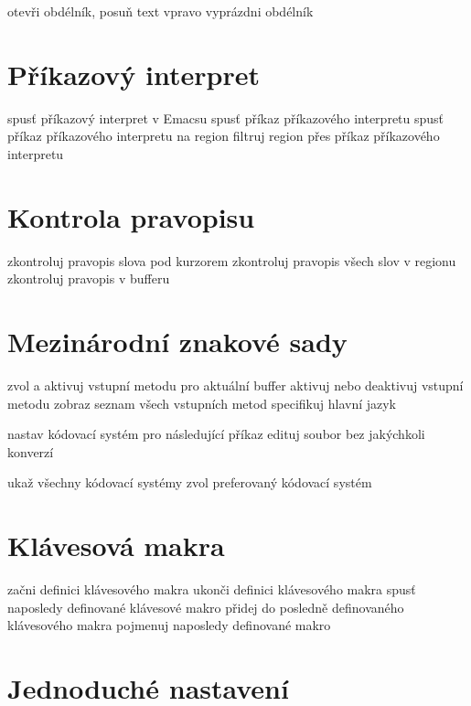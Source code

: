  otevři obdélník, posuň text vpravo
 vyprázdni obdélník

\section{Příkazový interpret}

 spusť příkazový interpret v Emacsu
 spusť příkaz příkazového interpretu
 spusť příkaz příkazového interpretu na region
 filtruj region přes příkaz příkazového interpretu

\section{Kontrola pravopisu}

 zkontroluj pravopis slova pod kurzorem
 zkontroluj pravopis všech slov v regionu
 zkontroluj pravopis v bufferu

\section{Mezinárodní znakové sady}

 zvol a aktivuj vstupní metodu pro aktuální buffer
 aktivuj nebo deaktivuj vstupní metodu
 zobraz seznam všech vstupních metod
 specifikuj hlavní jazyk

 nastav kódovací systém pro následující příkaz
 edituj soubor bez jakýchkoli konverzí

 ukaž všechny kódovací systémy
 zvol preferovaný kódovací systém

\section{Klávesová makra}

 začni definici klávesového makra
 ukonči definici klávesového makra
 spusť naposledy definované klávesové makro
 přidej do posledně definovaného klávesového makra
 pojmenuj naposledy definované makro

\section{Jednoduché nastavení}


